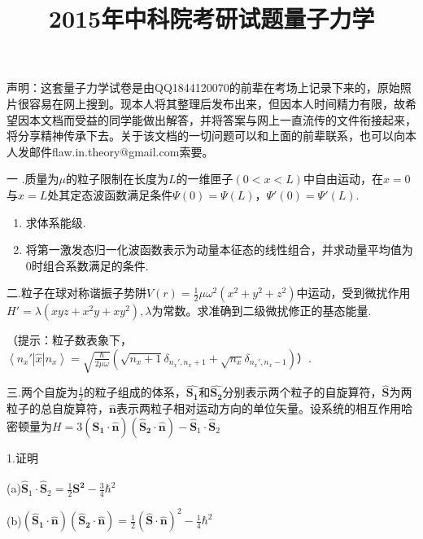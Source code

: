 \documentclass[UTF8]{ctexart}
\date{}
\begin{document}
\title{2015年中科院考研试题量子力学}

\maketitle

声明：这套量子力学试卷是由QQ1844120070的前辈在考场上记录下来的，原始照片很容易在网上搜到。现本人将其整理后发布出来，但因本人时间精力有限，故希望因本文档而受益的同学能做出解答，并将答案与网上一直流传的文件衔接起来，将分享精神传承下去。关于该文档的一切问题可以和上面的前辈联系，也可以向本人发邮件flaw.in.theory@gmail.com索要。

\noindent 一 .质量为$\mu$的粒子限制在长度为$L$的一维匣子$(0<x<L)$中自由运动，在$x=0$与$x=L$处其定态波函数满足条件$\Psi(0)=\Psi(L)$，$\Psi'(0)=\Psi'(L)$.
\begin{enumerate}
\item 求体系能级.
\item 将第一激发态归一化波函数表示为动量本征态的线性组合，并求动量平均值为$0$时组合系数满足的条件.
\end{enumerate}
二.粒子在球对称谐振子势阱$V\left(r\right)=\frac{1}{2}\mu\omega^{2}\left(x^{2}+y^{2}+z^{2}\right)$中运动，受到微扰作用$H'=\lambda\left(xyz+x^{2}y+xy^{2}\right),\lambda$为常数。求准确到二级微扰修正的基态能量.

（提示：粒子数表象下，$\left\langle n_{x}'\left|\hat{x}\right|n_{x}\right\rangle =\sqrt{\frac{\hbar}{2\mu\omega}}\left(\sqrt{n_{x}+1}\delta_{n_{x}',n_{x}+1}+\sqrt{n_{x}}\delta_{n_{x}',n_{x}-1}\right)$）.

\noindent 三.两个自旋为$\frac{1}{2}$的粒子组成的体系，$\boldsymbol{\hat{S_{1}}}$和$\boldsymbol{\hat{S_{2}}}$分别表示两个粒子的自旋算符，$\boldsymbol{\hat{S}}$为两粒子的总自旋算符，$\boldsymbol{\hat{\boldsymbol{n}}}$表示两粒子相对运动方向的单位矢量。设系统的相互作用哈密顿量为$H=3\left(\boldsymbol{\hat{S}_{1}}\cdot\boldsymbol{\hat{\boldsymbol{n}}}\right)\left(\boldsymbol{\hat{S}_{2}}\cdot\boldsymbol{\hat{\boldsymbol{n}}}\right)-\boldsymbol{\hat{S}}_{1}\cdot\boldsymbol{\hat{S}}_{2}$

1.证明

(a)$\boldsymbol{\hat{S}}_{1}\cdot\boldsymbol{\hat{S}}_{2}=\frac{1}{2}\boldsymbol{\hat{S^{2}}}-\frac{3}{4}\hbar^{2}$

(b)$\left(\boldsymbol{\hat{S}_{1}}\cdot\boldsymbol{\hat{\boldsymbol{n}}}\right)\left(\boldsymbol{\hat{S}_{2}}\cdot\boldsymbol{\hat{\boldsymbol{n}}}\right)=\frac{1}{2}\left(\boldsymbol{\hat{S}}\cdot\boldsymbol{\hat{n}}\right)^{2}-\frac{1}{4}\hbar^{2}$
\end{document}
